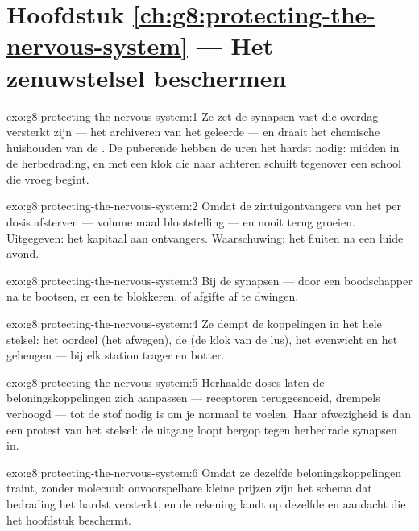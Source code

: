 \section*{Hoofdstuk \ref{ch:g8:protecting-the-nervous-system} --- Het zenuwstelsel beschermen}

\begin{solution}{exo:g8:protecting-the-nervous-system:1}
Ze zet de synapsen vast die overdag versterkt zijn --- het archiveren van
het geleerde --- en draait het chemische huishouden van de . De
puberende  hebben de uren het hardst nodig: midden in de
herbedrading, en met een klok die naar achteren schuift tegenover een
school die vroeg begint.
\end{solution}

\begin{solution}{exo:g8:protecting-the-nervous-system:2}
Omdat de zintuigontvangers van het  per dosis afsterven --- volume maal
blootstelling --- en nooit terug groeien. Uitgegeven: het kapitaal aan
ontvangers. Waarschuwing: het fluiten na een luide avond.
\end{solution}

\begin{solution}{exo:g8:protecting-the-nervous-system:3}
Bij de synapsen --- door een boodschapper na te bootsen, er een te
blokkeren, of afgifte af te dwingen.
\end{solution}

\begin{solution}{exo:g8:protecting-the-nervous-system:4}
Ze dempt de koppelingen in het hele stelsel: het oordeel (het afwegen), de
 (de klok van de lus), het evenwicht en het geheugen --- bij elk
station trager en botter.
\end{solution}

\begin{solution}{exo:g8:protecting-the-nervous-system:5}
Herhaalde doses laten de beloningskoppelingen zich aanpassen --- receptoren
teruggesnoeid, drempels verhoogd --- tot de stof nodig is om je normaal te
voelen. Haar afwezigheid is dan een protest van het stelsel: de uitgang
loopt bergop tegen herbedrade synapsen in.
\end{solution}

\begin{solution}{exo:g8:protecting-the-nervous-system:6}
Omdat ze dezelfde beloningskoppelingen traint, zonder molecuul:
onvoorspelbare kleine prijzen zijn het schema dat bedrading het hardst
versterkt, en de rekening landt op dezelfde  en aandacht die het
hoofdstuk beschermt.
\end{solution}

